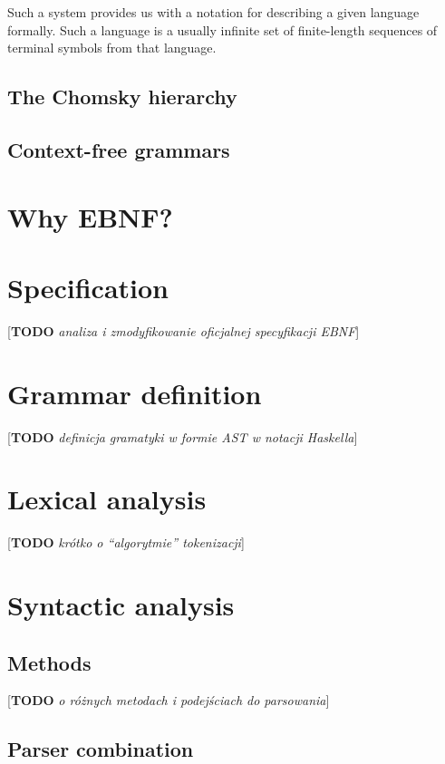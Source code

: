 \documentclass[english,engineering]{wizthesis}
\newcommand{\todo}[1]{{\color{red}[\textbf{TODO} \textit{#1}]}}
\begin{document}
Such a system provides us with a notation for describing a given
language formally. Such a language is a usually infinite set of finite-length
sequences of terminal symbols from that language.

\subsection{The Chomsky hierarchy}

\subsection{Context-free grammars}

\section{Why EBNF?}

\section{Specification}

\todo{analiza i zmodyfikowanie oficjalnej specyfikacji EBNF}

\section{Grammar definition}

\todo{definicja gramatyki w formie AST w notacji Haskella}

\section{Lexical analysis}

\todo{krótko o ``algorytmie'' tokenizacji}

\section{Syntactic analysis} \label{sec:parsing}

\subsection{Methods}

\todo{o różnych metodach i podejściach do parsowania}

\subsection{Parser combination}
\end{document}
